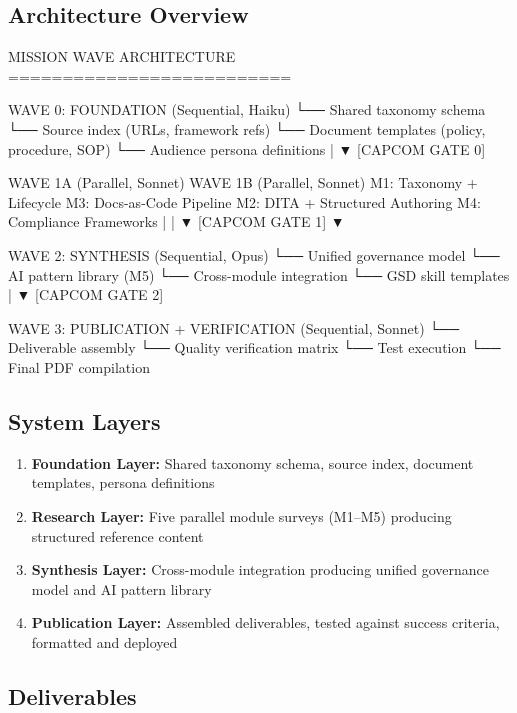 \documentclass[11pt,letterpaper]{article}
\begin{document}
\subsection{Architecture Overview}

\begin{asciibox}
MISSION WAVE ARCHITECTURE
==========================

WAVE 0: FOUNDATION (Sequential, Haiku)
  └── Shared taxonomy schema
  └── Source index (URLs, framework refs)
  └── Document templates (policy, procedure, SOP)
  └── Audience persona definitions
         |
         ▼ [CAPCOM GATE 0]
         
WAVE 1A (Parallel, Sonnet)          WAVE 1B (Parallel, Sonnet)
  M1: Taxonomy + Lifecycle           M3: Docs-as-Code Pipeline
  M2: DITA + Structured Authoring    M4: Compliance Frameworks
         |                                   |
         ▼ [CAPCOM GATE 1]                   ▼
         
WAVE 2: SYNTHESIS (Sequential, Opus)
  └── Unified governance model
  └── AI pattern library (M5)
  └── Cross-module integration
  └── GSD skill templates
         |
         ▼ [CAPCOM GATE 2]
         
WAVE 3: PUBLICATION + VERIFICATION (Sequential, Sonnet)
  └── Deliverable assembly
  └── Quality verification matrix
  └── Test execution
  └── Final PDF compilation
\end{asciibox}

\subsection{System Layers}

\begin{enumerate}[leftmargin=*]
  \item \textbf{Foundation Layer:} Shared taxonomy schema, source index, document templates, persona definitions
  \item \textbf{Research Layer:} Five parallel module surveys (M1--M5) producing structured reference content
  \item \textbf{Synthesis Layer:} Cross-module integration producing unified governance model and AI pattern library
  \item \textbf{Publication Layer:} Assembled deliverables, tested against success criteria, formatted and deployed
\end{enumerate}

\subsection{Deliverables}
\end{document}
